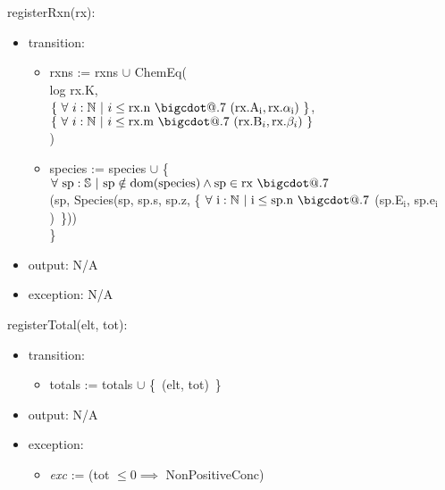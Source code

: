 \documentclass[12pt, titlepage]{article}
\makeatletter
\newcommand*\bigcdot{\mathpalette\bigcdot@{.7}}
\newcommand*\bigcdot@[2]
  {\mathbin{\vcenter{\hbox{\scalebox{#2}{$\m@th#1\bullet$}}}}}
\makeatother
\begin{document}
\noindent registerRxn(rx):
\begin{itemize}
\item transition: \begin{itemize} 
                  \item[] rxns := rxns $\cup$ ChemEq(\\
                  \hspace*{2em}log rx.K,\\
                  \hspace*{2em} $\{~\forall~i : \mathbb{N}~|~ i \leq \textrm{rx.n}  ~\bigcdot~ 
                    (\textrm{rx.A}_\textrm{i}, \textrm{rx.}\alpha_\textrm{i})~\}$,\\
                  \hspace*{2em} $\{~\forall~i : \mathbb{N}~|~ i \leq \textrm{rx.m}  ~\bigcdot~ 
                    (\textrm{rx.B}_i, \textrm{rx.}\beta_i)~\}$\\
                  )
                  \item[] species := species $\cup$ \{~$\forall~\textrm{sp} : \mathbb{S}
                    ~|~ \textrm{sp} \notin \textrm{dom(species)} \land \textrm{sp} \in \textrm{rx} ~\bigcdot~ $\\
                    \hspace*{2em}(sp, Species(sp, sp.s, sp.z, \{ $\forall~\textrm{i} : 
                      \mathbb{N}~|~ \textrm{i} \leq \textrm{sp.n} ~\bigcdot~ $(sp.E$_\textrm{i}$, sp.e$_\textrm{i}$)~\}))\\
                  \}
                  \end{itemize}
\item output: N/A
\item exception: N/A
\end{itemize}

\noindent registerTotal(elt, tot):
\begin{itemize}
\item transition: \begin{itemize} 
                  \item[] totals := totals $\cup$ \{~(elt, tot)~\}
                  \end{itemize}
\item output: N/A
\item exception: \begin{itemize}
                 \item[] \emph{exc} := (tot $\leq 0 \implies$ NonPositiveConc)
                 \end{itemize}
\end{itemize}
\end{document}
